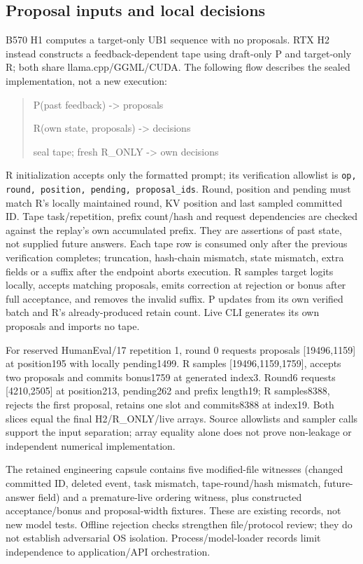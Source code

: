 \subsection{Proposal inputs and local decisions}
\label{app:h2audit}
B570 H1 computes a target-only UB1 sequence with no proposals. RTX H2 instead constructs a feedback-dependent tape using draft-only P and target-only R; both share llama.cpp/GGML/CUDA. The following flow describes the sealed implementation, not a new execution:
\begin{quote}\ttfamily
P(past feedback) -> proposals\par
R(own state, proposals) -> decisions\par
seal tape; fresh R\_ONLY -> own decisions
\end{quote}
R initialization accepts only the formatted prompt; its verification allowlist is \texttt{op, round, position, pending, proposal\_ids}. Round, position and pending must match R's locally maintained round, KV position and last sampled committed ID. Tape task/repetition, prefix count/hash and request dependencies are checked against the replay's own accumulated prefix. They are assertions of past state, not supplied future answers. Each tape row is consumed only after the previous verification completes; truncation, hash-chain mismatch, state mismatch, extra fields or a suffix after the endpoint aborts execution. R samples target logits locally, accepts matching proposals, emits correction at rejection or bonus after full acceptance, and removes the invalid suffix. P updates from its own verified batch and R's already-produced retain count. Live CLI generates its own proposals and imports no tape.

For reserved HumanEval/17 repetition 1, round 0 requests proposals [19496,1159] at position195 with locally pending1499. R samples [19496,1159,1759], accepts two proposals and commits bonus1759 at generated index3. Round6 requests [4210,2505] at position213, pending262 and prefix length19; R samples8388, rejects the first proposal, retains one slot and commits8388 at index19. Both slices equal the final H2/R\_ONLY/live arrays. Source allowlists and sampler calls support the input separation; array equality alone does not prove non-leakage or independent numerical implementation.

The retained engineering capsule contains five modified-file witnesses (changed committed ID, deleted event, task mismatch, tape-round/hash mismatch, future-answer field) and a premature-live ordering witness, plus constructed acceptance/bonus and proposal-width fixtures. These are existing records, not new model tests. Offline rejection checks strengthen file/protocol review; they do not establish adversarial OS isolation. Process/model-loader records limit independence to application/API orchestration.

